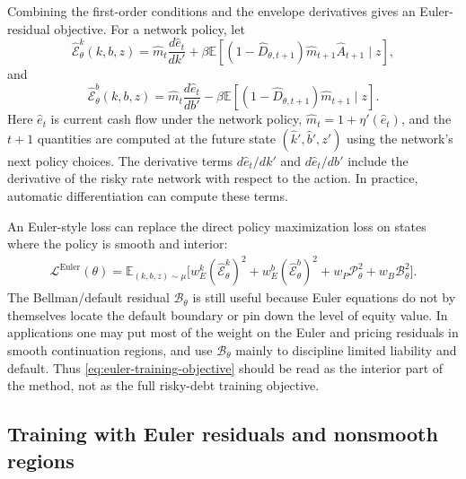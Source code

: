 \documentclass[11pt]{article}
\newcommand{\E}{\mathbb{E}}
\newcommand{\1}{\mathbf{1}}
\begin{document}
Combining the first-order conditions and the envelope derivatives gives an
Euler-residual objective. For a network policy, let
\begin{equation}
  \widehat{\mathcal E}^k_\theta(k,b,z)
  =
  \widehat m_t\frac{d\widehat e_t}{dk'}
  +\beta \E[
    (1-\widehat D_{\theta,t+1})\widehat m_{t+1}\widehat A_{t+1}
    \mid z],
  \label{eq:euler-residual-k}
\end{equation}
and
\begin{equation}
  \widehat{\mathcal E}^b_\theta(k,b,z)
  =
  \widehat m_t\frac{d\widehat e_t}{db'}
  -\beta \E[
    (1-\widehat D_{\theta,t+1})\widehat m_{t+1}
    \mid z].
  \label{eq:euler-residual-b}
\end{equation}
Here \(\widehat e_t\) is current cash flow under the network policy,
\(\widehat m_t=1+\eta'(\widehat e_t)\), and the \(t+1\) quantities are computed
at the future state \((\widehat k',\widehat b',z')\) using the network's next
policy choices. The derivative terms \(d\widehat e_t/dk'\) and
\(d\widehat e_t/db'\) include the derivative of the risky rate network with
respect to the action. In practice, automatic differentiation can compute these
terms.

An Euler-style loss can replace the direct policy maximization loss on states
where the policy is smooth and interior:
\begin{align}
  \mathcal L^{\mathrm{Euler}}(\theta)
  =
  \E_{(k,b,z)\sim\mu}
  \Big[
    w_E^k(\widehat{\mathcal E}^k_\theta)^2
    +w_E^b(\widehat{\mathcal E}^b_\theta)^2
    +w_P\mathcal P_\theta^2
    +w_B\mathcal B_\theta^2
  \Big].
  \label{eq:euler-training-objective}
\end{align}
The Bellman/default residual \(\mathcal B_\theta\) is still useful because Euler
equations do not by themselves locate the default boundary or pin down the
level of equity value. In applications one may put most of the weight on the
Euler and pricing residuals in smooth continuation regions, and use
\(\mathcal B_\theta\) mainly to discipline limited liability and default. Thus
\cref{eq:euler-training-objective} should be read as the interior part of the
method, not as the full risky-debt training objective.

\subsection{Training with Euler residuals and nonsmooth regions}
\label{subsec:euler-kkt-training}
\end{document}
